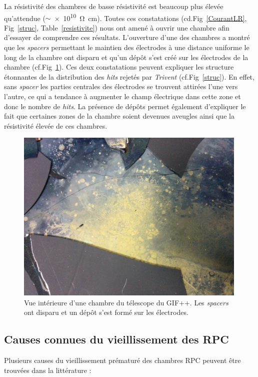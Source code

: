 La résistivité des chambres de basse résistivité est beaucoup plus élevée qu'attendue ($\sim$\SI{e10}{\ohm.\centi\meter}). Toutes ces constatations (cd.Fig~\ref{CourantLR}, Fig~\ref{struc}, Table~\ref{resistivite}) nous ont amené à ouvrir une chambre afin d'essayer de comprendre ces résultats.
\vspace{0.4cm}
\newpage
L'ouverture d'une des chambres a montré que les \textit{spacers} permettant le maintien des électrodes à une distance uniforme le long de la chambre ont disparu et qu'un dépôt s'est créé sur les électrodes de la chambre (cf.Fig~\ref{depot}). Ces deux constatations peuvent expliquer les structure étonnantes de la distribution des \textit{hits} rejetés par \textit{Trivent} (cf.Fig~\ref{struc}). En effet, sans \textit{spacer} les parties centrales des électrodes se trouvent attirées l'une vers l'autre, ce qui a tendance à augmenter le champ électrique dans cette zone et donc le nombre de \textit{hits}. La présence de dépôts permet également d'expliquer le fait que certaines zones de la chambre soient devenues aveugles ainsi que la résistivité élevée de ces chambres.
\vspace*{0.3cm}
\begin{figure}[!ht]
	\centering
	\includegraphics[width=0.99\textwidth]{GLA/depot.jpg}
	\caption{Vue intérieure d'une chambre du télescope du GIF++. Les \textit{spacers} ont disparu et un dépôt s'est formé sur les électrodes.}
	\label{depot}
\end{figure}

\subsection{Causes connues du vieillissement des RPC }
Plusieurs causes du vieillissement prématuré des chambres RPC peuvent être trouvées dans la littérature :

